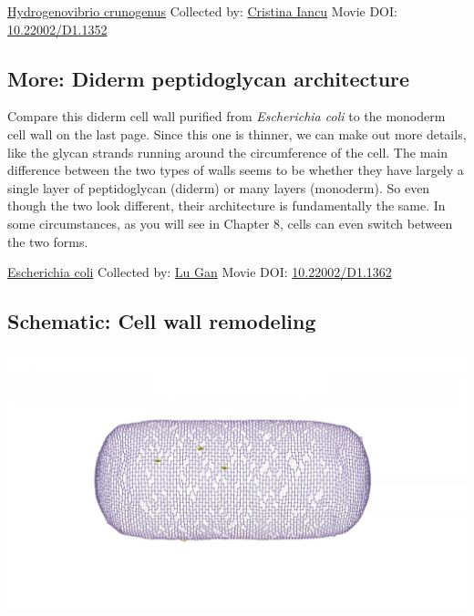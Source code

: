 \documentclass[]{tufte-book}
\begin{document}
\hypertarget{htmlwidget-a69555d4e997e5e7fc33}{}

\label{fig:2-3}\protect\hyperlink{tree}{Hydrogenovibrio crunogenus} Collected by: \protect\hyperlink{cristina_iancu}{Cristina Iancu} Movie DOI: \href{https://doi.org/10.22002/D1.1352}{10.22002/D1.1352}

\hypertarget{Diderm_peptidoglycan_architecture}{%
\subsection*{More: Diderm peptidoglycan architecture}\label{Diderm_peptidoglycan_architecture}}

Compare this diderm cell wall purified from \emph{Escherichia coli} to the monoderm cell wall on the last page. Since this one is thinner, we can make out more details, like the glycan strands running around the circumference of the cell. The main difference between the two types of walls seems to be whether they have largely a single layer of peptidoglycan (diderm) or many layers (monoderm). So even though the two look different, their architecture is fundamentally the same. In some circumstances, as you will see in Chapter 8, cells can even switch between the two forms.



\hypertarget{htmlwidget-36c34ab7a475c3f37f19}{}

\label{fig:2-3a}\protect\hyperlink{tree}{Escherichia coli} Collected by: \protect\hyperlink{lu_gan}{Lu Gan} Movie DOI: \href{https://doi.org/10.22002/D1.1362}{10.22002/D1.1362}

\hypertarget{Cell_wall_remodeling}{%
\subsection*{Schematic: Cell wall remodeling}\label{Cell_wall_remodeling}}

\includegraphics{img/schematics/2_3_1}
\end{document}
